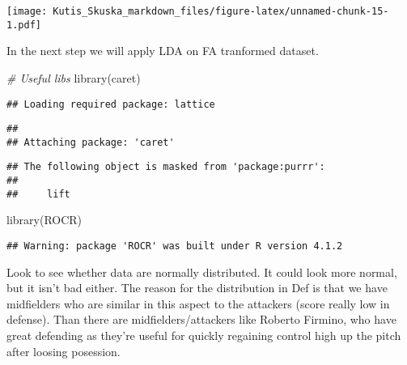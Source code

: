 \documentclass[
]{article}
\newenvironment{Shaded}{\begin{snugshade}}{\end{snugshade}}
\newcommand{\CommentTok}[1]{\textcolor[rgb]{0.56,0.35,0.01}{\textit{#1}}}
\newcommand{\FunctionTok}[1]{\textcolor[rgb]{0.00,0.00,0.00}{#1}}
\newcommand{\NormalTok}[1]{#1}
\begin{document}
\texttt{[image: Kutis\_Skuska\_markdown\_files/figure-latex/unnamed-chunk-15-1.pdf]}

In the next step we will apply LDA on FA tranformed dataset.

\begin{Shaded}
\begin{Highlighting}[]
\CommentTok{\# Useful libs}
\FunctionTok{library}\NormalTok{(caret)}
\end{Highlighting}
\end{Shaded}

\begin{verbatim}
## Loading required package: lattice
\end{verbatim}

\begin{verbatim}
## 
## Attaching package: 'caret'
\end{verbatim}

\begin{verbatim}
## The following object is masked from 'package:purrr':
## 
##     lift
\end{verbatim}

\begin{Shaded}
\begin{Highlighting}[]
\FunctionTok{library}\NormalTok{(ROCR)}
\end{Highlighting}
\end{Shaded}

\begin{verbatim}
## Warning: package 'ROCR' was built under R version 4.1.2
\end{verbatim}

Look to see whether data are normally distributed. It could look more
normal, but it isn't bad either. The reason for the distribution in Def
is that we have midfielders who are similar in this aspect to the
attackers (score really low in defense). Than there are
midfielders/attackers like Roberto Firmino, who have great defending as
they're useful for quickly regaining control high up the pitch after
loosing posession.
\end{document}
